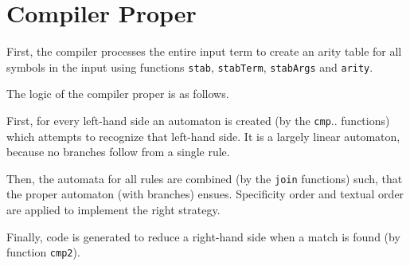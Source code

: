 \documentclass[11pt,twoside]{memoir}
\def\T{\texttt}
\begin{document}

        

\section{Compiler Proper}
First, the compiler processes the entire input term to create an arity table for all symbols in the input using functions \T{stab}, \T{stabTerm}, \T{stabArgs} and \T{arity}.


\noindent
The logic of the compiler proper is as follows. 

First, for every left-hand side an automaton is created (by the \T{cmp}.. functions) which attempts to recognize that left-hand side. It is a largely linear automaton, because no branches follow from a single rule. 

Then, the automata for all rules are combined (by the \T{join} functions) such, that the proper automaton (with branches) ensues. Specificity order and textual order are applied to implement the right strategy.

Finally, code is generated to reduce a right-hand side when a match is found (by function \T{cmp2}).
\end{document}

